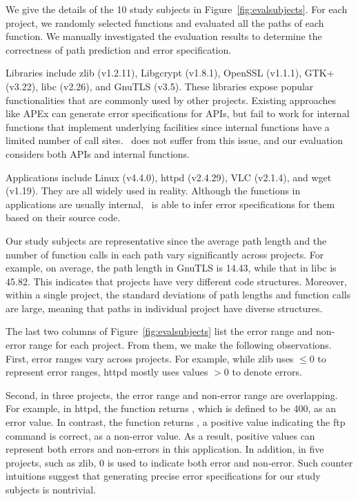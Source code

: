 \documentclass[12pt]{report}	%
\begin{document}
We give the details of the 10 study subjects in Figure~\ref{fig:evalsubjects}.
%
For each project, we randomly selected functions and evaluated all the paths of each function.
We manually investigated the evaluation results to determine the correctness of path prediction and error specification.

Libraries include zlib (v1.2.11), Libgcrypt (v1.8.1), OpenSSL (v1.1.1),
GTK+ (v3.22), libc (v2.26), and GnuTLS (v3.5). 
These libraries expose popular functionalities that are commonly used
by other projects.
%
Existing approaches like APEx can generate error specifications for APIs,
but fail to work for internal functions that implement underlying facilities
since internal functions have a limited number of call sites.
%
\newTool\ does not suffer from this issue, and our evaluation considers both 
APIs and internal functions.

Applications include 
Linux (v4.4.0), httpd (v2.4.29), VLC (v2.1.4), and wget (v1.19).
They are all widely used in reality.
%
Although the functions in applications are usually internal,
\newTool\ is able to infer error specifications for them 
based on their source code.

Our study subjects are representative 
since the average path length and the number of function calls in each path
vary significantly across projects.
For example, on average, the path length in GnuTLS
is 14.43, while that in libc is 45.82. 
This indicates that projects have very different 
code structures.
Moreover, within a single project, the standard 
deviations of path lengths and function calls are large,
meaning that paths in individual project have diverse structures. 

The last two columns of Figure~\ref{fig:evalsubjects} list
the error range and non-error range for each project. From them,
we make the following observations. 
%
First, error ranges vary across projects.
For example, while zlib uses $\leq 0$ to represent error ranges,
httpd mostly uses values $> 0$ to denote errors. 


Second, in three projects, the error range
and non-error range are overlapping. 
For example, in httpd, the
function  returns ,
which is defined to be 400, as an error value. In contrast,
the function  returns ,
a positive value indicating the ftp command is correct, as a non-error value.
As a result, positive values can represent 
both errors and non-errors in this application.
%
In addition,  in five projects, such as zlib, 
0 is used to indicate both error and non-error.
Such counter intuitions suggest that
generating precise error specifications for 
our study subjects is nontrivial.
\end{document}
